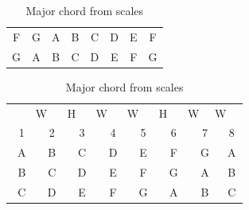 \begin{table}[h]
\begin{minipage}{0.45\textwidth}
\begin{tabular}{*{16}{c}}
			\multicolumn{2}{P{4mm}}{\ScaleRootCellFill F} & \multicolumn{2}{P{4mm}}{G} & \multicolumn{2}{P{4mm}}{\ScaleCellFill A} & \multicolumn{2}{P{4mm}}{B\flat} & \multicolumn{2}{P{4mm}}{\ScaleCellFill C} & \multicolumn{2}{P{4mm}}{D} & \multicolumn{2}{P{4mm}}{E} & \multicolumn{2}{P{4mm}}{F} \\
			\multicolumn{2}{P{4mm}}{\ScaleRootCellFill G} & \multicolumn{2}{P{4mm}}{A} & \multicolumn{2}{P{4mm}}{\ScaleCellFill B} & \multicolumn{2}{P{4mm}}{C} & \multicolumn{2}{P{4mm}}{\ScaleCellFill D} & \multicolumn{2}{P{4mm}}{E} & \multicolumn{2}{P{4mm}}{F\sharp} & \multicolumn{2}{P{4mm}}{G} \\
		\end{tabular}
		\caption{Major chord from scales}
		\label{tab:guitar_major_chords_from_scales}
	\end{minipage}
	\hfill
	\begin{minipage}{0.45\textwidth}
		\centering
		\begin{tabular}{*{16}{c}}
			& \multicolumn{2}{P{4mm}}{\large{W}} & \multicolumn{2}{P{4mm}}{\large{H}} & \multicolumn{2}{P{4mm}}{\large{W}} & \multicolumn{2}{P{4mm}}{\large{W}} & \multicolumn{2}{P{4mm}}{\large{H}} & \multicolumn{2}{P{4mm}}{\large{W}} & \multicolumn{2}{P{4mm}}{\large{W}} & \\
			\multicolumn{2}{P{4mm}}{1} & \multicolumn{2}{P{4mm}}{2} & \multicolumn{2}{P{4mm}}{3} & \multicolumn{2}{P{4mm}}{4} & \multicolumn{2}{P{4mm}}{5} & \multicolumn{2}{P{4mm}}{6} & \multicolumn{2}{P{4mm}}{7} & \multicolumn{2}{P{4mm}}{8} \\
			\multicolumn{2}{P{4mm}}{\ScaleRootCellFill A} & \multicolumn{2}{P{4mm}}{B} & \multicolumn{2}{P{4mm}}{\ScaleCellFill C} & \multicolumn{2}{P{4mm}}{D} & \multicolumn{2}{P{4mm}}{\ScaleCellFill E} & \multicolumn{2}{P{4mm}}{F} & \multicolumn{2}{P{4mm}}{G} & \multicolumn{2}{P{4mm}}{A} \\
			\multicolumn{2}{P{4mm}}{\ScaleRootCellFill B} & \multicolumn{2}{P{4mm}}{C\sharp} & \multicolumn{2}{P{4mm}}{\ScaleCellFill D} & \multicolumn{2}{P{4mm}}{E} & \multicolumn{2}{P{4mm}}{\ScaleCellFill F\sharp} & \multicolumn{2}{P{4mm}}{G} & \multicolumn{2}{P{4mm}}{A} & \multicolumn{2}{P{4mm}}{B} \\
			\multicolumn{2}{P{4mm}}{\ScaleRootCellFill C} & \multicolumn{2}{P{4mm}}{D} & \multicolumn{2}{P{4mm}}{\ScaleCellFill E\flat} & \multicolumn{2}{P{4mm}}{F} & \multicolumn{2}{P{4mm}}{\ScaleCellFill G} & \multicolumn{2}{P{4mm}}{A\flat} & \multicolumn{2}{P{4mm}}{B\flat} & \multicolumn{2}{P{4mm}}{C} \\

\end{tabular}
\end{minipage}
\end{table}
